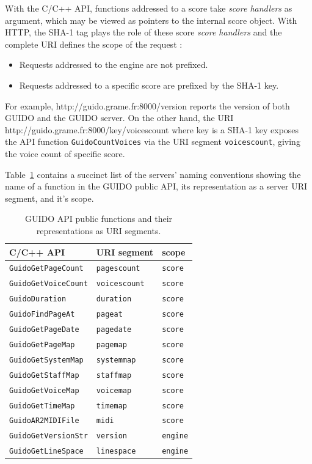 \documentclass[11pt,a4paper]{article}
\newenvironment{mcode}		{\vspace{-2mm} \fontsize{10pt}{12pt}\selectfont \verbatim}{\endverbatim\vspace{-2mm}}
\begin{document}
With the C/C++ API, functions addressed to a score take \emph{score handlers} as argument, which may be viewed as pointers to the internal score object. With HTTP, the SHA-1 tag plays the role of these score \emph{score handlers} and the complete URI defines the scope of the request :	
\begin{itemize}[noitemsep]
\item Requests addressed to the engine are not prefixed.
\item Requests addressed to a specific score are prefixed by the SHA-1 key.
\end{itemize}
For example,
\begin{mcode}
 http://guido.grame.fr:8000/version
\end{mcode}
reports the version of both GUIDO and the GUIDO server. On the other hand, the URI
\begin{mcode}
 http://guido.grame.fr:8000/key/voicescount
        where key is a SHA-1 key
\end{mcode}
exposes the API function \verb=GuidoCountVoices= via the URI segment \verb=voicescount=, giving the voice count of specific score.\par
Table~\ref{table:table1} contains a succinct list of the servers' naming conventions showing the name of a function in the GUIDO public API, its representation as a server URI segment, and it's scope.
\begin{table}
\centering
{\small \begin{tabular}{|l|l|l|}\hline
C/C++ API & URI segment & scope \\\hline
\verb=GuidoGetPageCount= & \verb=pagescount= & \verb=score= \\\hline
\verb=GuidoGetVoiceCount= & \verb=voicescount= & \verb=score= \\\hline
\verb=GuidoDuration= & \verb=duration= & \verb=score= \\\hline
\verb=GuidoFindPageAt= & \verb=pageat= & \verb=score= \\\hline
\verb=GuidoGetPageDate= & \verb=pagedate= & \verb=score= \\\hline
\verb=GuidoGetPageMap= & \verb=pagemap= & \verb=score= \\\hline
\verb=GuidoGetSystemMap= & \verb=systemmap= & \verb=score= \\\hline
\verb=GuidoGetStaffMap= & \verb=staffmap= & \verb=score= \\\hline
\verb=GuidoGetVoiceMap= & \verb=voicemap= & \verb=score= \\\hline
\verb=GuidoGetTimeMap= & \verb=timemap= & \verb=score= \\\hline
\verb=GuidoAR2MIDIFile= & \verb=midi= & \verb=score= \\\hline
\verb=GuidoGetVersionStr= & \verb=version= & \verb=engine= \\\hline
\verb=GuidoGetLineSpace= & \verb=linespace= & \verb=engine= \\\hline
\end{tabular}
}
\cprotect\caption{\label{table:table1} GUIDO API public functions and their representations as URI segments.}
\end{table}
\end{document}
